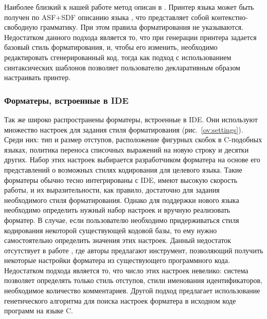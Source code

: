 Наиболее близкий к нашей работе метод описан в \cite{paper:asf-sdf}.
Принтер языка может быть получен по ASF+SDF описанию языка \cite{paper:klint}, что представляет собой контекстно-свободную грамматику.
При этом правила форматирования не указываются.
Недостатком данного подхода является то, что при генерации принтера задается базовый стиль форматирования, и, чтобы его изменить, необходимо редактировать сгенерированный код, тогда как подход с использованием синтаксических шаблонов позволяет пользователю декларативным образом настраивать принтер.

\subsubsection{Форматеры, встроенные в IDE}
Так же широко распространены форматеры, встроенные в IDE.
Они используют множество настроек для задания стиля форматирования (рис.~\ref{ov:settings}).
Среди них: тип и размер отступов, расположение фигурных скобок в C-подобных языках, политика переноса списочных выражений на новую строку и десятки других.
Набор этих настроек выбирается разработчиком форматера на основе его представлений о возможных стилях кодирования для целевого языка.
Такие форматеры обычно тесно интегрированы с IDE, имеют высокую скорость работы, и их выразительности, как правило, достаточно для задания необходимого стиля форматирования.
Однако для поддержки нового языка необходимо определить нужный набор настроек и вручную реализовать форматер.
В случае, если пользователю необходимо придерживаться стиля кодирования некоторой существующей кодовой базы, то ему нужно самостоятельно определить значения этих настроек.
Данный недостаток отсутствует в работе \cite{paper:sformatters}, где авторы предлагают инструмент, позволяющий получить некоторые настройки форматера из существующего программного кода.
Недостатком подхода является то, что число этих настроек невелико: система позволяет определять только стиль отступов, стили именования идентификаторов, необходимое количество комментариев.
Другой подход \cite{blog:genformat} предлагает использование генетического алгоритма 
для поиска настроек форматера в исходном коде программ на языке C.

